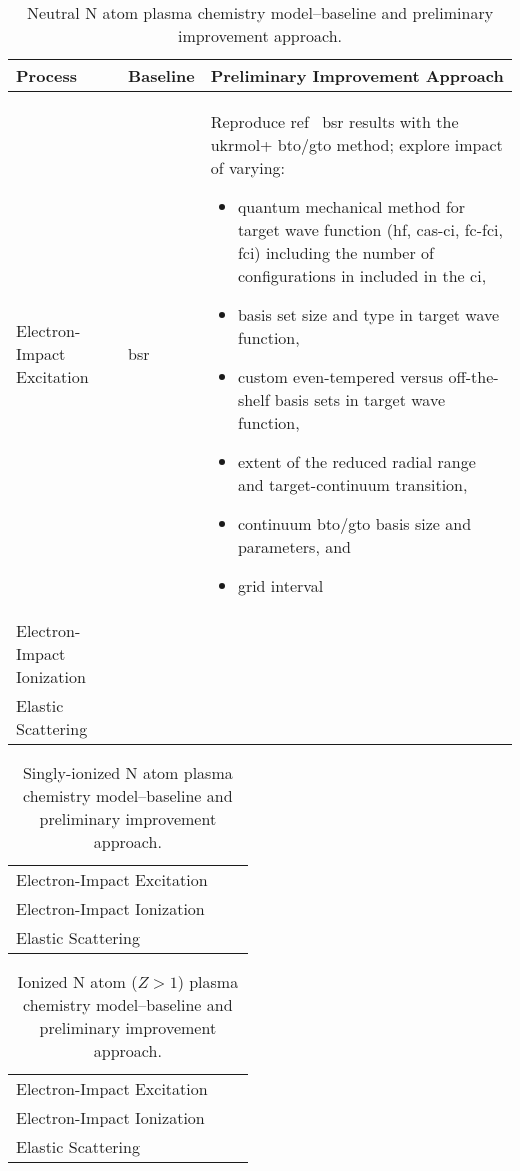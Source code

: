 \begin{sidewaystable}
		\caption{Neutral N atom plasma chemistry model--baseline and preliminary improvement approach.}
		\centering
		\begin{tabular}{ p{4cm} p{5cm} p{12cm} }
				\hline\hline
				Process & Baseline & Preliminary Improvement Approach \\ \hline
				Electron-Impact Excitation & \ac{bsr}\cite{wang2014} & 
				Reproduce ref~\cite{wang2014} \ac{bsr} results with the \ac{ukrmol+}
				\ac{bto}/\ac{gto} method;
				explore impact of varying: 
				\begin{itemize}
						\item quantum mechanical method for target wave function (\ac{hf}, 
								\ac{cas}-\ac{ci}, \ac{fc}-\ac{fci}, \ac{fci}) including the number of configurations in included in the \ac{ci},
						\item basis set size and type in target wave function,
						\item custom even-tempered versus off-the-shelf basis sets in target
								wave function, 
						\item extent of the reduced radial range and target-continuum transition,
						\item continuum \ac{bto}/\ac{gto} basis size and parameters, and
						\item \bspline{} grid interval
				\end{itemize} \\
				Electron-Impact Ionization & &  \\
				Elastic Scattering & &  \\
				\hline
		\end{tabular}
\end{sidewaystable}

\begin{sidewaystable}
		\caption{Singly-ionized N atom plasma chemistry model--baseline and preliminary improvement approach.}
		\centering
		\begin{tabular}{ p{5cm} p{8cm} p{8cm} }
				\hline\hline
				Electron-Impact Excitation &  & \\
				Electron-Impact Ionization &  & \\
				Elastic Scattering & &  \\
				\hline
		\end{tabular}
\end{sidewaystable}

\begin{sidewaystable}
		\caption{Ionized N atom ($Z>1$) plasma chemistry model--baseline and preliminary improvement approach.}
		\centering
		\begin{tabular}{ p{5cm} p{8cm} p{8cm} }
				\hline\hline
				Electron-Impact Excitation &  & \\
				Electron-Impact Ionization & & \\
				Elastic Scattering & & \\
				\hline
		\end{tabular}
\end{sidewaystable}

